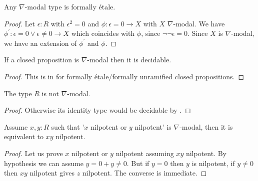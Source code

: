 \begin{lemma}
  Any \(\nabla\)-modal type is formally étale.
\end{lemma}

\begin{proof}
  Let \(\epsilon:R\) with \(\epsilon^2=0\) and \(\phi:\epsilon=0\to X\) with \(X\) \(\nabla\)-modal.
  We have \(\phi^\prime:\epsilon=0\vee\epsilon\neq 0\to X\) which coincides with \(\phi\),
  since \(\neg\neg\epsilon=0\).
  Since \(X\) is \(\nabla\)-modal, we have an extension of \(\phi^\prime\) and \(\phi\).
\end{proof}

\begin{lemma}\label{closed-not-nabla}
If a closed proposition is $\nabla$-modal then it is decidable.
\end{lemma}

\begin{proof}
  This is in \cite{diffgeo-article} for formally étale/formally unramified closed propositions.
\end{proof}

\begin{corollary}
The type $R$ is not $\nabla$-modal.
\end{corollary}

\begin{proof}
Otherwise its identity type would be decidable by .
\end{proof}

\begin{lemma}
Assume $x,y:R$ such that '$x$ nilpotent or $y$ nilpotent' is $\nabla$-modal, then it is equivalent to $xy$ nilpotent.
\end{lemma}

\begin{proof}
Let us prove $x$ nilpotent or $y$ nilpotent assuming $xy$ nilpotent. By hypothesis we can assume $y=0+y\not=0$. But if $y=0$ then $y$ is nilpotent, if $y\not=0$ then $xy$ nilpotent gives $z$ nilpotent. The converse is immediate.
\end{proof}
